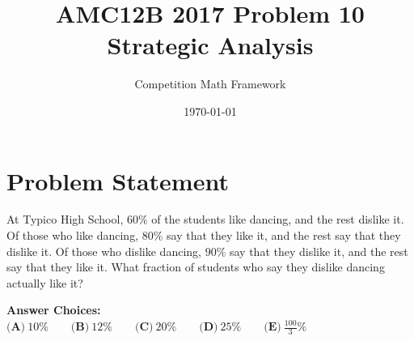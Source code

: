 \documentclass[]{article}
\begin{document}
\title{\textbf{AMC12B 2017 Problem 10\\Strategic Analysis}}
\author{Competition Math Framework}
\date{\today}
\maketitle

\section*{Problem Statement}

At Typico High School, $60\%$ of the students like dancing, and the rest dislike it. Of those who like dancing, $80\%$ say that they like it, and the rest say that they dislike it. Of those who dislike dancing, $90\%$ say that they dislike it, and the rest say that they like it. What fraction of students who say they dislike dancing actually like it?

\vspace{0.5em}
\textbf{Answer Choices:}\\
$\textbf{(A)}\ 10\%\qquad\textbf{(B)}\ 12\%\qquad\textbf{(C)}\ 20\%\qquad\textbf{(D)}\ 25\%\qquad\textbf{(E)}\ \frac{100}{3}\%$
\end{document}
